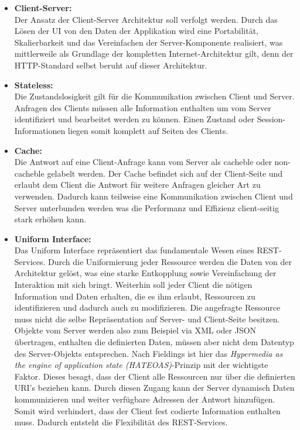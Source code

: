 \documentclass[fleqn,10pt,ngerman]{SelfArx}
\begin{document}
\begin{itemize}
	\item \textbf{Client-Server:}\\ Der Ansatz der Client-Server Architektur soll verfolgt werden. Durch das Lösen der UI von den Daten der Applikation wird eine Portabilität, Skalierbarkeit und das Vereinfachen der Server-Komponente realisiert, was mittlerweile als Grundlage der kompletten Internet-Architektur gilt, denn der HTTP-Standard selbst beruht auf dieser Architektur.
	\item \textbf{Stateless:}\\ Die Zustandslosigkeit gilt für die Kommunikation zwischen Client und Server. Anfragen des Clients müssen alle Information enthalten um vom Server identifiziert und bearbeitet werden zu können. Einen Zustand oder Session-Informationen liegen somit komplett auf Seiten des Clients.
	\item \textbf{Cache:}\\ Die Antwort auf eine Client-Anfrage kann vom Server als cacheble oder non-cacheble gelabelt werden. Der Cache befindet sich auf der Client-Seite und erlaubt dem Client die Antwort für weitere Anfragen gleicher Art zu verwenden. Dadurch kann teilweise eine Kommunikation zwischen Client und Server unterbunden werden was die Performanz und Effizienz client-seitig stark erhöhen kann.
	\item \textbf{Uniform Interface:}\\ Das Uniform Interface repräsentiert das fundamentale Wesen eines REST-Services. Durch die Uniformierung jeder Ressource werden die Daten von der Architektur gelöst, was eine starke Entkopplung sowie Vereinfachung der Interaktion mit sich bringt. Weiterhin soll jeder Client die nötigen Information und Daten erhalten, die es ihm erlaubt, Ressourcen zu identifizieren und dadurch auch zu modifizieren. Die angefragte Ressource muss nicht die selbe Repräsentation auf Server- und Client-Seite besitzen. Objekte vom Server werden also zum Beispiel via XML oder JSON übertragen, enthalten die definierten Daten, müssen aber nicht dem Datentyp des Server-Objekts entsprechen. Nach Fieldings ist hier das \textit{Hypermedia as the engine of application state (HATEOAS)}-Prinzip mit der wichtigste Faktor. Dieses besagt, dass der Client alle Ressourcen nur über die definierten URI's beziehen kann. Durch diesen Zugang kann der Server dynamisch Daten kommunizieren und weiter verfügbare Adressen der Antwort hinzufügen. Somit wird verhindert, dass der Client fest codierte Information enthalten muss. Dadurch entsteht die Flexibilität des REST-Services.

\end{itemize}
\end{document}
